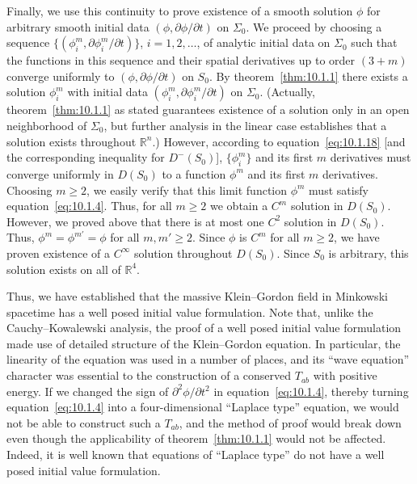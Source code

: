Finally, we use this continuity to prove existence of a smooth solution \(\phi\) for
arbitrary smooth initial data \((\phi,\partial\phi/\partial t)\) on \(\Sigma_0\). We
proceed by choosing a sequence \(\{(\phi_i^m,\partial\phi_i^m/\partial t)\}\),
\(i=1,2,\ldots\), of analytic initial data on \(\Sigma_0\) such that the functions in
this sequence and their spatial derivatives up to order \((3+m)\) converge uniformly
to \((\phi,\partial\phi/\partial t)\) on \(S_0\). By theorem~\ref{thm:10.1.1} there
exists a solution \(\phi_i^m\) with initial data
\((\phi_i^m,\partial\phi_i^m/\partial t)\) on \(\Sigma_0\). (Actually,
theorem~\ref{thm:10.1.1} as stated guarantees existence of a solution only in an open
neighborhood of \(\Sigma_0\), but further analysis in the linear case establishes that
a solution exists throughout \(\mathbb R^n\).) However, according to
equation~\eqref{eq:10.1.18} [and the corresponding inequality for \(D^-(S_0)\)],
\(\{\phi_i^m\}\) and its first \(m\) derivatives must converge uniformly in
\(D(S_0)\) to a function \(\phi^m\) and its first \(m\) derivatives. Choosing
\(m\geq2\), we easily verify that this limit function \(\phi^m\) must satisfy
equation~\eqref{eq:10.1.4}. Thus, for all \(m\geq2\) we obtain a \(C^m\) solution
in \(D(S_0)\). However, we proved above that there is at most one \(C^2\) solution
in \(D(S_0)\). Thus, \(\phi^m=\phi^{m'}=\phi\) for all \(m,m'\geq2\). Since
\(\phi\) is \(C^m\) for all \(m\geq2\), we have proven existence of a
\(C^\infty\) solution throughout \(D(S_0)\). Since \(S_0\) is arbitrary, this
solution exists on all of \(\mathbb R^4\).

Thus, we have established that the massive Klein--Gordon field in Minkowski
spacetime has a well posed initial value formulation. Note that, unlike the
Cauchy--Kowalewski analysis, the proof of a well posed initial value formulation
made use of detailed structure of the Klein--Gordon equation. In particular, the
linearity of the equation was used in a number of places, and its ``wave equation''
character was essential to the construction of a conserved \(T_{ab}\) with positive
energy. If we changed the sign of \(\partial^2\phi/\partial t^2\) in
equation~\eqref{eq:10.1.4}, thereby turning equation~\eqref{eq:10.1.4} into a
four-dimensional ``Laplace type'' equation, we would not be able to construct such
a \(T_{ab}\), and the method of proof would break down even though the
applicability of theorem~\ref{thm:10.1.1} would not be affected. Indeed, it is well
known that equations of ``Laplace type'' do not have a well posed initial value
formulation.

